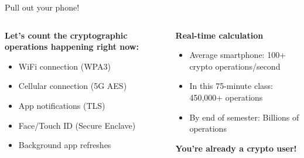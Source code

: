 \documentclass[aspectratio=169, lualatex, handout]{beamer}
\begin{document}
\begin{frame}{Pull out your phone!}
	\begin{columns}[c]
		\begin{column}{0.5\textwidth}
			\textbf{Let's count the cryptographic operations happening right now:}
			\begin{itemize}[<+->]
				\item WiFi connection (WPA3)
				\item Cellular connection (5G AES)
				\item App notifications (TLS)
				\item Face/Touch ID (Secure Enclave)
				\item Background app refreshes
			\end{itemize}
		\end{column}
		\begin{column}{0.5\textwidth}
			\textbf{Real-time calculation}
			\begin{itemize}[<+->]
				\item Average smartphone: 100+ crypto operations/second
				\item In this 75-minute class: 450,000+ operations
				\item By end of semester: Billions of operations
			\end{itemize}
			\vspace{0.5cm}
			\textcolor{cipherprimary}{\textbf{You're already a crypto user!}}
		\end{column}
	\end{columns}
\end{frame}
\end{document}
